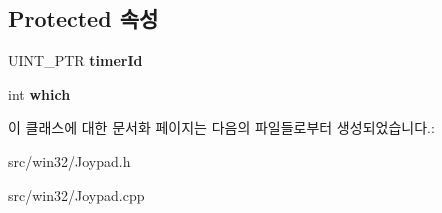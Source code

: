 \subsection*{Protected 속성}
\begin{DoxyCompactItemize}
\item 
\mbox{\label{class_joypad_config_ae2eb21b8f63e8cf86a5461e78901c3f5}} 
U\+I\+N\+T\+\_\+\+P\+TR {\bfseries timer\+Id}
\item 
\mbox{\label{class_joypad_config_ad71f1ad36754d788de00eb4bb5630dda}} 
int {\bfseries which}
\end{DoxyCompactItemize}


이 클래스에 대한 문서화 페이지는 다음의 파일들로부터 생성되었습니다.\+:\begin{DoxyCompactItemize}
\item 
src/win32/Joypad.\+h\item 
src/win32/Joypad.\+cpp\end{DoxyCompactItemize}
